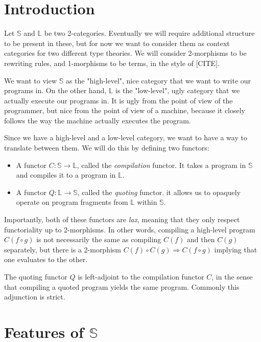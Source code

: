 \section{Introduction}

\def\S{\mathbb{S}}
\def\L{\mathbb{L}}
\def\funct{\longrightarrow}
\def\Ob{\mathrm{Ob}}
\def\Hom{\mathrm{Hom}}
\def\Cat{\mathbf{Cat}}
\def\Set{\mathbf{Set}}

Let $\S$ and $\L$ be two 2-categories. Eventually we will require additional
structure to be present in these, but for now we want to consider them as
context categories for two different type theories. We will consider
2-morphisms to be rewriting rules, and 1-morphisms to be terms, in the style of
  [CITE].

We want to view $\S$ as the "high-level", nice category that we want to write
our programs in. On the other hand, $\L$ is the "low-level", ugly category that
we actually execute our programs in. It is ugly from the point of view of the
programmer, but nice from the point of view of a machine, because it closely
follows the way the machine actually executes the program.

Since we have a high-level and a low-level category, we want to have a way to
translate between them. We will do this by defining two functors:
\begin{itemize}
  \item A functor $C : \S \funct \L $, called the \emph{compilation} functor. It takes
        a program in $\S$ and compiles it to a program in $\L$.
  \item A functor $Q : \L \funct \S $, called the \emph{quoting} functor. it allows us
        to opaquely operate on program fragments from $\L$ within $\S$.
\end{itemize}

Importantly, both of these functors are \emph{lax}, meaning that they only
respect functoriality up to 2-morphisms. In other words, compiling a high-level
program $C(f \circ g)$ is not necessarily the same as compiling $C(f)$ and then
$C(g)$ separately, but there is a 2-morphism $ C(f) \circ C(g) \Rightarrow C(f
  \circ g)$ implying that one evaluates to the other.

The quoting functor $Q$ is left-adjoint to the compilation functor $C$, in the
sense that compiling a quoted program yields the same program. Commonly this
adjunction is strict.

\section{Features of $\S$}

